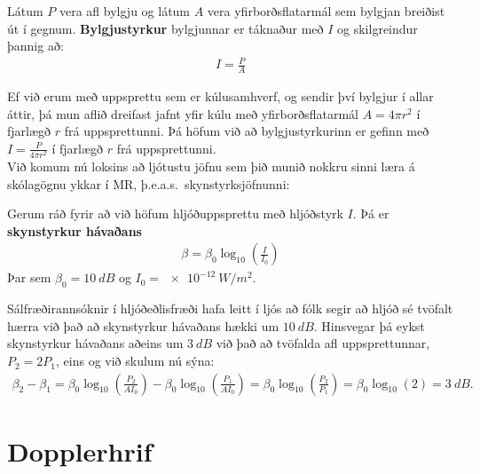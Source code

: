 \begin{tcolorbox}
\begin{definition}
Látum $P$ vera afl bylgju og látum $A$ vera yfirborðsflatarmál sem bylgjan breiðist út í gegnum. \textbf{Bylgjustyrkur} bylgjunnar er táknaður með $I$ og skilgreindur þannig að:
\begin{align*}
    I = \frac{P}{A}
\end{align*}
\end{definition}
\end{tcolorbox}

Ef við erum með uppsprettu sem er kúlusamhverf, og sendir því bylgjur í allar áttir, þá mun aflið dreifast jafnt yfir kúlu með yfirborðsflatarmál $A = 4\pi r^2$ í fjarlægð $r$ frá uppsprettunni. Þá höfum við að bylgjustyrkurinn er gefinn með $I = \frac{P}{4\pi r^2}$ í fjarlægð $r$ frá uppsprettunni. \\

Við komum nú loksins að ljótustu jöfnu sem þið munið nokkru sinni læra á skólagögnu ykkar í MR, þ.e.a.s.~skynstyrksjöfnunni:

\begin{tcolorbox}
\begin{definition}
Gerum ráð fyrir að við höfum hljóðuppsprettu með hljóðstyrk $I$. Þá er \textbf{skynstyrkur hávaðans}
\begin{align*}
    \beta = \beta_0 \log_{10}\left(\frac{I}{I_0}\right)
\end{align*}
Þar sem $\beta_0 = \SI{10}{dB}$ og $I_0 = \SI{e-12}{W/m^2}$.
\end{definition}
\end{tcolorbox}


Sálfræðirannsóknir í hljóðeðlisfræði hafa leitt í ljós að fólk segir að hljóð sé tvöfalt hærra við það að skynstyrkur hávaðans hækki um $\SI{10}{dB}$. Hinsvegar þá eykst skynstyrkur hávaðans aðeins um $\SI{3}{dB}$ við það að tvöfalda afl uppsprettunnar, $P_2 = 2P_1$, eins og við skulum nú sýna:
\begin{align*}
    \beta_2 - \beta_1 = \beta_0 \log_{10}\left( \frac{P_2}{A I_0} \right) - \beta_0 \log_{10}\left( \frac{P_1}{A I_0} \right) = \beta_0 \log_{10}\left( \frac{P_2}{P_1} \right) = \beta_0 \log_{10}(2) = \SI{3}{dB}.
\end{align*}

\section{Dopplerhrif}

